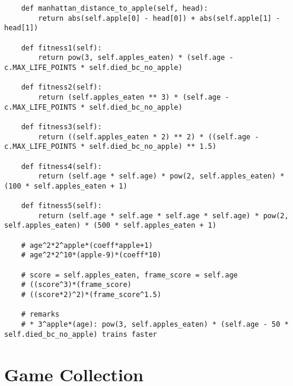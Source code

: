 \documentclass[11pt,a4paper]{article}
\begin{document}
\begin{verbatim}
    def manhattan_distance_to_apple(self, head):
        return abs(self.apple[0] - head[0]) + abs(self.apple[1] - head[1])

    def fitness1(self):
        return pow(3, self.apples_eaten) * (self.age - c.MAX_LIFE_POINTS * self.died_bc_no_apple)

    def fitness2(self):
        return (self.apples_eaten ** 3) * (self.age - c.MAX_LIFE_POINTS * self.died_bc_no_apple)

    def fitness3(self):
        return ((self.apples_eaten * 2) ** 2) * ((self.age - c.MAX_LIFE_POINTS * self.died_bc_no_apple) ** 1.5)

    def fitness4(self):
        return (self.age * self.age) * pow(2, self.apples_eaten) * (100 * self.apples_eaten + 1)

    def fitness5(self):
        return (self.age * self.age * self.age * self.age) * pow(2, self.apples_eaten) * (500 * self.apples_eaten + 1)

    # age^2*2^apple*(coeff*apple+1)
    # age^2*2^10*(apple-9)*(coeff*10)

    # score = self.apples_eaten, frame_score = self.age
    # ((score^3)*(frame_score)
    # ((score*2)^2)*(frame_score^1.5)

    # remarks
    # * 3^apple*(age): pow(3, self.apples_eaten) * (self.age - 50 * self.died_bc_no_apple) trains faster

\end{verbatim}

\section{Game Collection}
\end{document}
